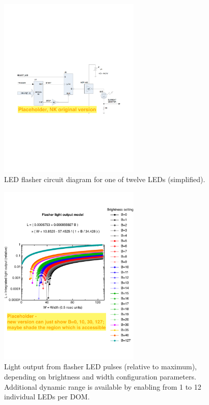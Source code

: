 \begin{figure}[h]
 \centering
 \includegraphics[width=0.6\textwidth]{graphics/dom/functional/domfig4-FlasherDiagram.pdf}
 \caption{LED flasher circuit diagram for one of twelve LEDs (simplified).}
 \label{fig:flasherdiagram}
\end{figure}

\begin{figure}[h]
 \centering
 \includegraphics[width=0.6\textwidth]{graphics/dom/functional/domfig5-BrightnessModel.pdf}
 \caption{Light output from flasher LED pulses (relative to maximum), depending
on brightness and width configuration parameters.  Additional dynamic range is available
by enabling from 1 to 12 individual LEDs per DOM.}
 \label{fig:flasheroutput}
\end{figure}

